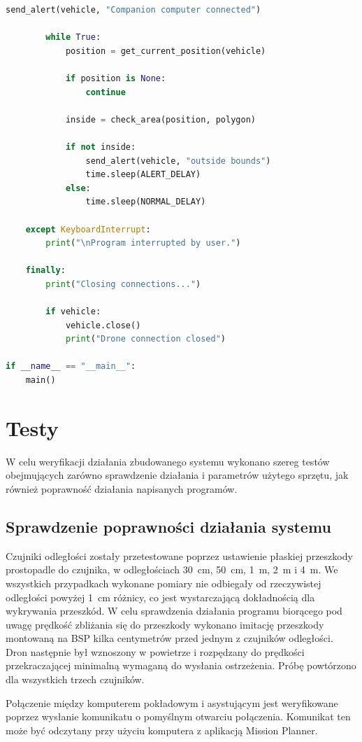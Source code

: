 \documentclass[a4paper,12pt]{book}
\begin{document}
\begin{lstlisting}[language=python, caption={Program ostrzegający o wykroczeniu poza wyznaczony obszar}, label={lst:program:area}]
        send_alert(vehicle, "Companion computer connected")

        while True:
            position = get_current_position(vehicle)

            if position is None:
                continue

            inside = check_area(position, polygon)

            if not inside:
                send_alert(vehicle, "outside bounds")
                time.sleep(ALERT_DELAY)
            else:
                time.sleep(NORMAL_DELAY)

    except KeyboardInterrupt:
        print("\nProgram interrupted by user.")

    finally:
        print("Closing connections...")

        if vehicle:
            vehicle.close()
            print("Drone connection closed")

if __name__ == "__main__":
    main()
        \end{lstlisting}

    \section{Testy}
        W celu weryfikacji działania zbudowanego systemu wykonano szereg testów  obejmujących
        zarówno sprawdzenie działania i parametrów użytego sprzętu, jak również poprawność działania napisanych programów.
        \subsection{Sprawdzenie poprawności działania systemu}
        Czujniki odległości zostały przetestowane poprzez ustawienie płaskiej przeszkody prostopadle do czujnika, w odległościach 30~cm, 50~cm, 1~m, 2~m i 4~m. 
        We wszystkich przypadkach wykonane pomiary nie odbiegały od rzeczywistej odległości powyżej 1~cm różnicy, co jest wystarczającą dokładnością dla 
        wykrywania przeszkód. W celu sprawdzenia działania programu biorącego pod uwagę prędkość zbliżania się do przeszkody wykonano imitację przeszkody 
        montowaną na BSP kilka centymetrów przed jednym z czujników odległości. Dron następnie był wznoszony w powietrze i rozpędzany do prędkości przekraczającej 
        minimalną wymaganą do wysłania ostrzeżenia. Próbę powtórzono dla wszystkich trzech czujników.\par
        Połączenie między komputerem pokładowym i asystującym jest weryfikowane poprzez wysłanie komunikatu o pomyślnym otwarciu połączenia. Komunikat ten może 
        być odczytany przy użyciu komputera z aplikacją Mission Planner.
\end{document}
